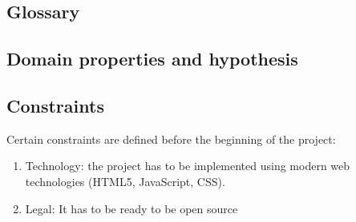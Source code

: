 \subsection{Glossary}

\subsection{Domain properties and hypothesis}
\subsection{Constraints}
Certain constraints are defined before the beginning of the project:
\begin{enumerate}
    \item Technology: the project has to be implemented using modern web technologies (\ac{HTML5}, JavaScript, \ac{CSS}).
    \item Legal: It has to be ready to be open source
\end{enumerate}


